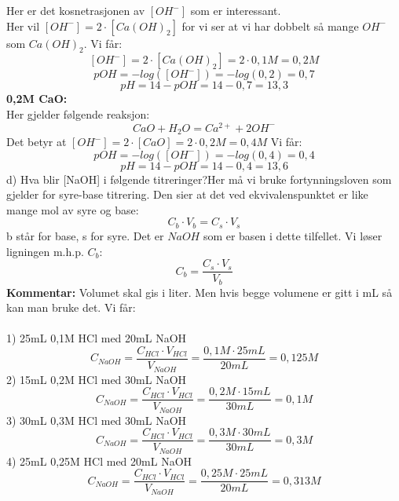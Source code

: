 \documentclass{minmal}
\begin{document}
Her er det kosnetrasjonen av $[OH^-]$ som er interessant.\\
Her vil $[OH^-]=2\cdot[Ca(OH)_2]$ for vi ser at vi har dobbelt så mange $OH^-$ som $Ca(OH)_2$. Vi får:
$$[OH^-]=2\cdot [Ca(OH)_2]=2\cdot 0,1M=0,2M $$
$$pOH=-log([OH^-])=-log(0,2)=0,7$$
$$pH=14-pOH=14-0,7=13,3$$
\textbf{0,2M CaO:}\\
Her gjelder følgende reaksjon:
$$CaO+H_2O=Ca^{2+}+2OH^-$$
Det betyr at $[OH^-]=2\cdot [CaO]=2\cdot 0,2M=0,4M$
Vi får:
$$pOH=-log([OH^-])=-log(0,4)=0,4$$
$$pH=14-pOH=14-0,4=13,6$$
d) Hva blir [NaOH] i følgende titreringer?\nl[1]
Her må vi bruke fortynningsloven som gjelder for syre-base titrering.  Den sier at det ved ekvivalenspunktet er like mange mol av syre og base:\nl[1]
$$C_b\cdot V_b=C_s\cdot V_s$$
b står for base, s for syre. Det er $NaOH$ som er basen i dette tilfellet.  Vi løser ligningen m.h.p.  $C_b$:
$$C_b=\frac{C_s\cdot V_s}{V_b}$$
\textbf{Kommentar:} Volumet skal gis i liter. Men hvis begge volumene er gitt i mL så kan man bruke det.\newpage  
Vi får:\\\\
1) 25mL 0,1M HCl med 20mL NaOH\nl[1]
$$C_{NaOH}=\frac{C_{HCl}\cdot V_{HCl}}{V_{NaOH}}=\frac{0,1M\cdot 25mL}{20mL}=0,125M$$
2) 15mL 0,2M HCl med 30mL NaOH\nl[1]
$$C_{NaOH}=\frac{C_{HCl}\cdot V_{HCl}}{V_{NaOH}}=\frac{0,2M\cdot 15mL}{30mL}=0,1M$$
3) 30mL 0,3M HCl med 30mL NaOH\nl[1]
$$C_{NaOH}=\frac{C_{HCl}\cdot V_{HCl}}{V_{NaOH}}=\frac{0,3M\cdot 30mL}{30mL}=0,3M$$
4) 25mL 0,25M HCl med 20mL NaOH\nl[1]
$$C_{NaOH}=\frac{C_{HCl}\cdot V_{HCl}}{V_{NaOH}}=\frac{0,25M\cdot 25mL}{20mL}=0,313M$$
\end{document}
